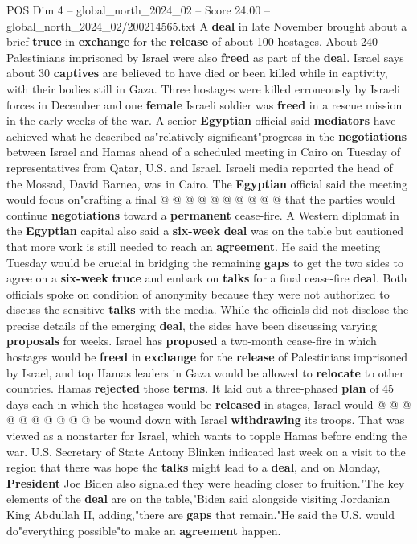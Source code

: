 \begin{textsample}{POS Dim 4 – global\_north\_2024\_02 – Score 24.00 – global\_north\_2024\_02/200214565.txt}
A \textbf{deal} in late November brought about a brief \textbf{truce} in \textbf{exchange} for the \textbf{release} of about 100 hostages.
About 240 Palestinians imprisoned by Israel were also \textbf{freed} as part of the \textbf{deal}.
Israel says about 30 \textbf{captives} are believed to have died or been killed while in captivity, with their bodies still in Gaza.
Three hostages were killed erroneously by Israeli forces in December and one \textbf{female} Israeli soldier was \textbf{freed} in a rescue mission in the early weeks of the war.
A senior \textbf{Egyptian} official said \textbf{mediators} have achieved what he described as"relatively significant"progress in the \textbf{negotiations} between Israel and Hamas ahead of a scheduled meeting in Cairo on Tuesday of representatives from Qatar, U.S. and Israel.
Israeli media reported the head of the Mossad, David Barnea, was in Cairo.
The \textbf{Egyptian} official said the meeting would focus on"crafting a final @ @ @ @ @ @ @ @ @ @ that the parties would continue \textbf{negotiations} toward a \textbf{permanent} cease-fire.
A Western diplomat in the \textbf{Egyptian} capital also said a \textbf{six-week} \textbf{deal} was on the table but cautioned that more work is still needed to reach an \textbf{agreement}.
He said the meeting Tuesday would be crucial in bridging the remaining \textbf{gaps} to get the two sides to agree on a \textbf{six-week} \textbf{truce} and embark on \textbf{talks} for a final cease-fire \textbf{deal}.
Both officials spoke on condition of anonymity because they were not authorized to discuss the sensitive \textbf{talks} with the media.
While the officials did not disclose the precise details of the emerging \textbf{deal}, the sides have been discussing varying \textbf{proposals} for weeks.
Israel has \textbf{proposed} a two-month cease-fire in which hostages would be \textbf{freed} in \textbf{exchange} for the \textbf{release} of Palestinians imprisoned by Israel, and top Hamas leaders in Gaza would be allowed to \textbf{relocate} to other countries.
Hamas \textbf{rejected} those \textbf{terms}.
It laid out a three-phased \textbf{plan} of 45 days each in which the hostages would be \textbf{released} in stages, Israel would @ @ @ @ @ @ @ @ @ @ be wound down with Israel \textbf{withdrawing} its troops.
That was viewed as a nonstarter for Israel, which wants to topple Hamas before ending the war.
U.S.
Secretary of State Antony Blinken indicated last week on a visit to the region that there was hope the \textbf{talks} might lead to a \textbf{deal}, and on Monday, \textbf{President} Joe Biden also signaled they were heading closer to fruition."The key elements of the \textbf{deal} are on the table,"Biden said alongside visiting Jordanian King Abdullah II, adding,"there are \textbf{gaps} that remain."He said the U.S. would do"everything possible"to make an \textbf{agreement} happen.

\end{textsample}
